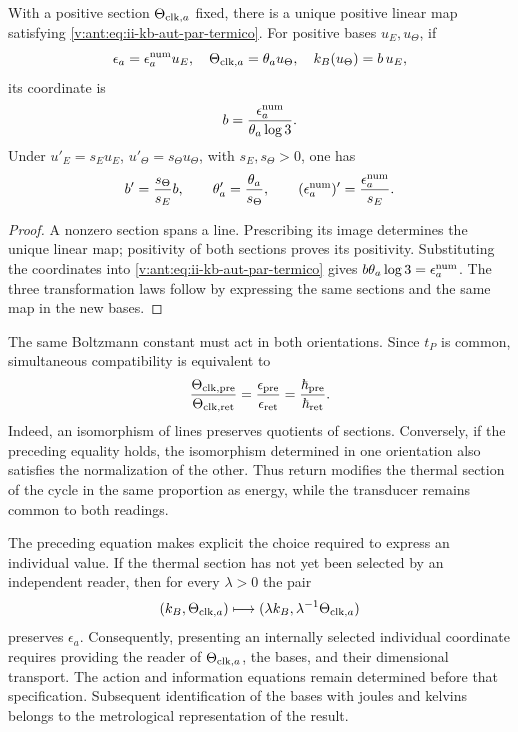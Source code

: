 \begin{theorem}
With a positive section \(\Theta_{{\rm clk},a}\) fixed, there is a
unique positive linear map satisfying
\eqref{v:ant:eq:ii-kb-aut-par-termico}. For positive bases \(u_E,u_\Theta\),
if
\[
 \epsilon_a=\epsilon_a^{\rm num}u_E,\quad
 \Theta_{{\rm clk},a}=\theta_a u_\Theta,\quad
 k_B(u_\Theta)=b\,u_E,
\]
its coordinate is
\begin{equation}
 b=\frac{\epsilon_a^{\rm num}}{\theta_a\log3}.
 \label{v:ant:eq:ii-kb-aut-coordenada}
\end{equation}
Under \(u'_E=s_Eu_E\), \(u'_\Theta=s_\Theta u_\Theta\), with
\(s_E,s_\Theta>0\), one has
\[
 b'=\frac{s_\Theta}{s_E}b,\qquad
 \theta'_a=\frac{\theta_a}{s_\Theta},\qquad
 (\epsilon_a^{\rm num})'=\frac{\epsilon_a^{\rm num}}{s_E}.
\]
\end{theorem}
\begin{proof}
A nonzero section spans a line. Prescribing its image determines
the unique linear map; positivity of both sections proves
its positivity. Substituting the coordinates into
\eqref{v:ant:eq:ii-kb-aut-par-termico} gives
\(b\theta_a\log3=\epsilon_a^{\rm num}\). The three transformation
laws follow by expressing the same sections and the same
map in the new bases.
\end{proof}

The same Boltzmann constant must act in both orientations.
Since \(t_P\) is common, simultaneous compatibility is equivalent to
\begin{equation}
 \frac{\Theta_{{\rm clk},{\rm pre}}}{\Theta_{{\rm clk},{\rm ret}}}
 =\frac{\epsilon_{\rm pre}}{\epsilon_{\rm ret}}
 =\frac{\hbar_{\rm pre}}{\hbar_{\rm ret}}.
 \label{v:ant:eq:ii-kb-aut-orientaciones}
\end{equation}
Indeed, an isomorphism of lines preserves quotients of sections.
Conversely, if the preceding equality holds, the isomorphism
determined in one orientation also satisfies the normalization of
the other. Thus return modifies the thermal section of the cycle in the
same proportion as energy, while the transducer remains
common to both readings.

The preceding equation makes explicit the choice required to express an
individual value. If the thermal section has not yet been selected
by an independent reader, then for every \(\lambda>0\) the pair
\[
 (k_B,\Theta_{{\rm clk},a})
 \longmapsto(\lambda k_B,\lambda^{-1}\Theta_{{\rm clk},a})
\]
preserves \(\epsilon_a\). Consequently, presenting an
internally selected individual coordinate requires providing the reader of
\(\Theta_{{\rm clk},a}\), the bases, and their dimensional transport.
The action and information equations remain determined before
that specification. Subsequent identification of the bases with
joules and kelvins belongs to the metrological representation of the result.

